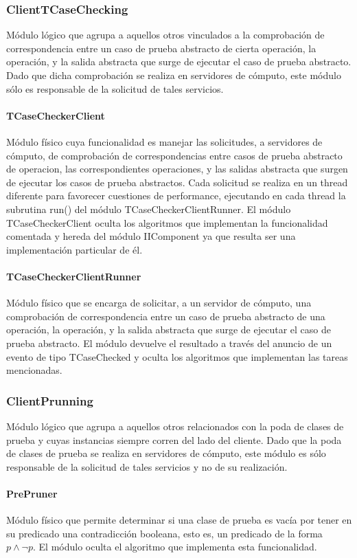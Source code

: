 \documentclass[a4paper,10pt]{report}
\begin{document}
			\subsubsection{ClientTCaseChecking}
			Módulo lógico que agrupa a aquellos otros vinculados a la comprobación de correspondencia entre un caso de prueba abstracto de cierta operación, la operación, y la salida abstracta que surge de ejecutar el caso de prueba abstracto. Dado que dicha comprobación se realiza en servidores de cómputo, este módulo sólo es responsable de la solicitud de tales servicios.
				\paragraph{TCaseCheckerClient}
				Módulo físico cuya funcionalidad es manejar las solicitudes, a servidores de cómputo, de comprobación de correspondencias entre casos de prueba abstracto de operacion, las correspondientes operaciones, y las salidas abstracta que surgen de ejecutar los casos de prueba abstractos. Cada solicitud se realiza en un thread diferente para favorecer cuestiones de performance, ejecutando en cada thread la subrutina run() del módulo TCaseCheckerClientRunner. El módulo TCaseCheckerClient oculta los algoritmos que implementan la funcionalidad comentada y hereda del módulo IIComponent ya que resulta ser una implementación particular de él.
				\paragraph{TCaseCheckerClientRunner}
				Módulo físico que se encarga de solicitar, a un servidor de cómputo, una comprobación de correspondencia entre un caso de prueba abstracto de una operación, la operación, y la salida abstracta que surge de ejecutar el caso de prueba abstracto. El módulo devuelve el resultado a través del anuncio de un evento de tipo TCaseChecked y oculta los algoritmos que implementan las tareas mencionadas.
			\subsubsection{ClientPrunning}
			Módulo lógico que agrupa a aquellos otros relacionados con la poda de clases de prueba y cuyas instancias siempre corren del lado del cliente. Dado que la poda de clases de prueba se realiza en servidores de cómputo, este módulo es sólo responsable de la solicitud de tales servicios y no de su realización.
				\paragraph{PrePruner}
				Módulo físico que permite determinar si una clase de prueba es vacía por tener en su predicado una contradicción booleana, esto es, un predicado de la forma $p \land \lnot p$. El módulo oculta el algoritmo que implementa esta funcionalidad.
\end{document}
